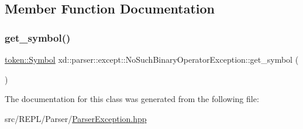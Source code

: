 \subsection{Member Function Documentation}
\mbox{\label{classxd_1_1parser_1_1except_1_1_no_such_binary_operator_exception_ae0bf0d0d4cdddfe45d72b1ef64b1117f}} 
\subsubsection{\texorpdfstring{get\+\_\+symbol()}{get\_symbol()}}
{\footnotesize\ttfamily \mbox{\hyperlink{classxd_1_1parser_1_1token_1_1_symbol}{token\+::\+Symbol}} xd\+::parser\+::except\+::\+No\+Such\+Binary\+Operator\+Exception\+::get\+\_\+symbol (\begin{DoxyParamCaption}{ }\end{DoxyParamCaption})\hspace{0.3cm}{\ttfamily [inline]}}



The documentation for this class was generated from the following file\+:\begin{DoxyCompactItemize}
\item 
src/\+R\+E\+P\+L/\+Parser/\mbox{\hyperlink{_parser_exception_8hpp}{Parser\+Exception.\+hpp}}\end{DoxyCompactItemize}
